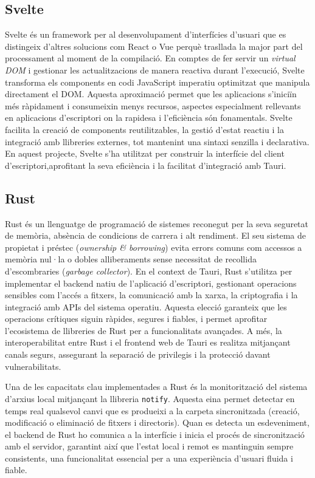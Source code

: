 \subsection*{Svelte}
Svelte és un framework per al desenvolupament d'interfícies d'usuari que es distingeix d'altres solucions com React o Vue perquè trasllada la major part del processament al moment de la compilació. En comptes de fer servir un \emph{virtual DOM} i gestionar les actualitzacions de manera reactiva durant l'execució, Svelte transforma els components en codi JavaScript imperatiu optimitzat que manipula directament el DOM. Aquesta aproximació permet que les aplicacions s'iniciïn més ràpidament i consumeixin menys recursos, aspectes especialment rellevants en aplicacions d'escriptori on la rapidesa i l'eficiència són fonamentals. Svelte facilita la creació de components reutilitzables, la gestió d'estat reactiu i la integració amb llibreries externes, tot mantenint una sintaxi senzilla i declarativa. En aquest projecte, Svelte s'ha utilitzat per construir la interfície del client d'escriptori,aprofitant la seva eficiència i la facilitat d'integració amb Tauri.

\subsection*{Rust}
Rust és un llenguatge de programació de sistemes reconegut per la seva seguretat de memòria, absència de condicions de carrera i alt rendiment. El seu sistema de propietat i préstec (\emph{ownership \& borrowing}) evita errors comuns com accessos a memòria nul·la o dobles alliberaments sense necessitat de recollida d'escombraries (\emph{garbage collector}). En el context de Tauri, Rust s'utilitza per implementar el backend natiu de l'aplicació d'escriptori, gestionant operacions sensibles com l'accés a fitxers, la comunicació amb la xarxa, la criptografia i la integració amb APIs del sistema operatiu. Aquesta elecció garanteix que les operacions crítiques siguin ràpides, segures i fiables, i permet aprofitar l'ecosistema de llibreries de Rust per a funcionalitats avançades. A més, la interoperabilitat entre Rust i el frontend web de Tauri es realitza mitjançant canals segurs, assegurant la separació de privilegis i la protecció davant vulnerabilitats.

Una de les capacitats clau implementades a Rust és la monitorització del sistema d'arxius local mitjançant la llibreria \texttt{notify}. Aquesta eina permet detectar en temps real qualsevol canvi que es produeixi a la carpeta sincronitzada (creació, modificació o eliminació de fitxers i directoris). Quan es detecta un esdeveniment, el backend de Rust ho comunica a la interfície i inicia el procés de sincronització amb el servidor, garantint així que l'estat local i remot es mantinguin sempre consistents, una funcionalitat essencial per a una experiència d'usuari fluida i fiable.

